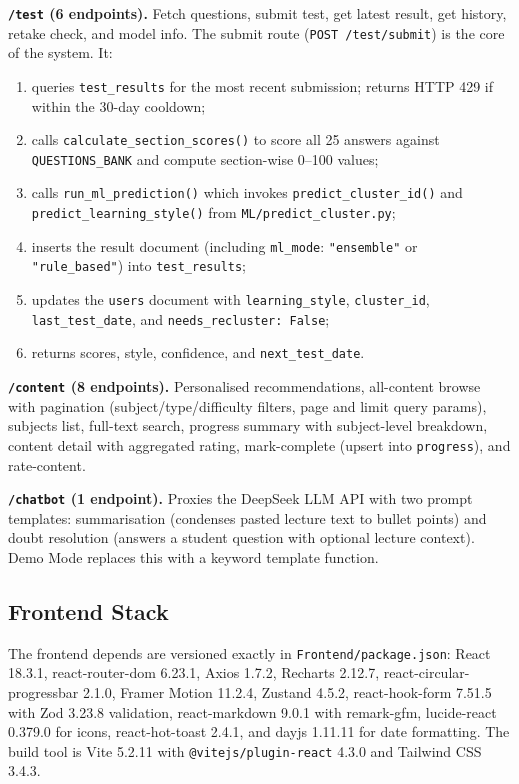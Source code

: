 \documentclass[12pt,a4paper]{article}
\begin{document}
\noindent\textbf{\texttt{/test} (6 endpoints).}
Fetch questions, submit test, get latest result, get history,
retake check, and model info. The submit route (\texttt{POST
/test/submit}) is the core of the system. It:
\begin{enumerate}[leftmargin=*, nosep]
  \item queries \texttt{test\_results} for the most recent submission;
    returns HTTP 429 if within the 30-day cooldown;
  \item calls \texttt{calculate\_section\_scores()} to score all 25
    answers against \texttt{QUESTIONS\_BANK} and compute section-wise
    0--100 values;
  \item calls \texttt{run\_ml\_prediction()} which invokes
    \texttt{predict\_cluster\_id()} and \texttt{predict\_learning\_style()}
    from \texttt{ML/predict\_cluster.py};
  \item inserts the result document (including \texttt{ml\_mode}:
    \texttt{"ensemble"} or \texttt{"rule\_based"}) into
    \texttt{test\_results};
  \item updates the \texttt{users} document with \texttt{learning\_style},
    \texttt{cluster\_id}, \texttt{last\_test\_date}, and
    \texttt{needs\_recluster: False};
  \item returns scores, style, confidence, and
    \texttt{next\_test\_date}.
\end{enumerate}

\noindent\textbf{\texttt{/content} (8 endpoints).}
Personalised recommendations, all-content browse with pagination
(subject/type/difficulty filters, page and limit query params),
subjects list, full-text search, progress summary with
subject-level breakdown, content detail with aggregated rating,
mark-complete (upsert into \texttt{progress}), and rate-content.

\noindent\textbf{\texttt{/chatbot} (1 endpoint).}
Proxies the DeepSeek LLM API with two prompt templates:
summarisation (condenses pasted lecture text to bullet points) and
doubt resolution (answers a student question with optional lecture
context). Demo Mode replaces this with a keyword template function.

\subsection{Frontend Stack}

The frontend depends are versioned exactly in
\texttt{Frontend/package.json}: React 18.3.1, react-router-dom
6.23.1, Axios 1.7.2, Recharts 2.12.7, react-circular-progressbar
2.1.0, Framer Motion 11.2.4, Zustand 4.5.2, react-hook-form 7.51.5
with Zod 3.23.8 validation, react-markdown 9.0.1 with remark-gfm,
lucide-react 0.379.0 for icons, react-hot-toast 2.4.1, and dayjs
1.11.11 for date formatting. The build tool is Vite 5.2.11 with
\texttt{@vitejs/plugin-react} 4.3.0 and Tailwind CSS 3.4.3.
\end{document}
